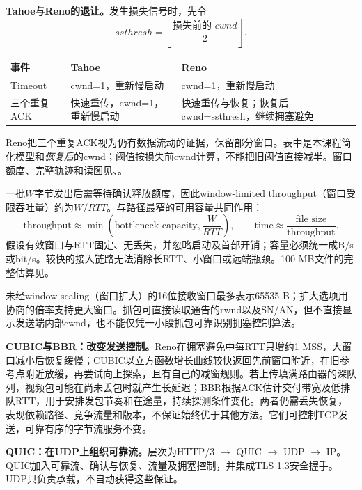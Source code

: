 \textbf{Tahoe与Reno的退让。}发生损失信号时，先令
\[
 ssthresh=\left\lfloor\frac{\text{损失前的 }cwnd}{2}\right\rfloor.
\]
\begin{center}
\small
\begin{tabularx}{\textwidth}{@{}p{2.5cm}XX@{}}
\toprule
事件 & Tahoe & Reno \\
\midrule
Timeout & cwnd=1，重新慢启动 & cwnd=1，重新慢启动 \\
三个重复ACK & 快速重传，cwnd=1，重新慢启动 & 快速重传与恢复；恢复后cwnd=ssthresh，继续拥塞避免 \\
\bottomrule
\end{tabularx}
\end{center}
Reno把三个重复ACK视为仍有数据流动的证据，保留部分窗口。表中是本课程简化模型和\emph{恢复后}的cwnd；阈值按损失前cwnd计算，不能把旧阈值直接减半。窗口额度、完整轨迹和读图见、。


一批$W$字节发出后需等待确认释放额度，因此window-limited throughput（窗口受限吞吐量）约为$W/RTT$。与路径最窄的可用容量共同作用：
\[
 \boxed{\text{throughput}\approx
 \min\!\left(\text{bottleneck capacity},\frac{W}{RTT}\right)},
 \qquad
 \boxed{\text{time}\approx\frac{\text{file size}}{\text{throughput}}}.
\]
假设有效窗口与RTT固定、无丢失，并忽略启动及首部开销；容量必须统一成B/s或bit/s。较快的接入链路无法消除长RTT、小窗口或远端瓶颈。100 MB文件的完整估算见。

未经window scaling（窗口扩大）的16位接收窗口最多表示65535 B；扩大选项用协商的倍率支持更大窗口。抓包可直接读取通告的rwnd以及SN/AN，但不直接显示发送端内部cwnd，也不能仅凭一小段抓包可靠识别拥塞控制算法。


\textbf{CUBIC与BBR：改变发送控制。}Reno在拥塞避免中每RTT只增约1 MSS，大窗口减小后恢复缓慢；CUBIC以立方函数增长曲线较快返回先前窗口附近，在旧参考点附近放缓，再尝试向上探索，且有自己的减窗规则。若上传填满路由器的深队列，视频包可能在尚未丢包时就产生长延迟；BBR根据ACK估计交付带宽及低排队RTT，用于安排发包节奏和在途量，持续探测条件变化。两者仍需丢失恢复，表现依赖路径、竞争流量和版本，不保证始终优于其他方法。它们可控制TCP发送，可靠有序的字节流服务不变。

\textbf{QUIC：在UDP上组织可靠流。}层次为HTTP/3 $\to$ QUIC $\to$ UDP $\to$ IP。QUIC加入可靠流、确认与恢复、流量及拥塞控制，并集成TLS 1.3安全握手。UDP只负责承载，不自动获得这些保证。

